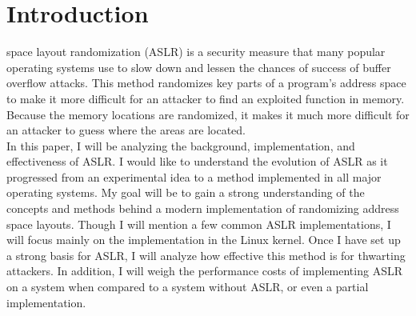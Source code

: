 \section{Introduction}
\label{s:intro} %

 space layout randomization (ASLR) is a security measure that many popular operating systems use to slow down and lessen the chances of success of buffer overflow attacks. This method randomizes key parts of a program’s address space to make it more difficult for an attacker to find an exploited function in memory. Because the memory locations are randomized, it makes it much more difficult for an attacker to guess where the areas are located.
\\
In this paper, I will be analyzing the background, implementation, and effectiveness of ASLR. I would like to understand the evolution of ASLR as it progressed from an experimental idea to a method implemented in all major operating systems. My goal will be to gain a strong understanding of the concepts and methods behind a modern implementation of randomizing address space layouts. Though I will mention a few common ASLR implementations, I will focus mainly on the implementation in the Linux kernel. Once I have set up a strong basis for ASLR, I will analyze how effective this method is for thwarting attackers. In addition, I will weigh the performance costs of implementing ASLR on a system when compared to a system without ASLR, or even a partial implementation.

